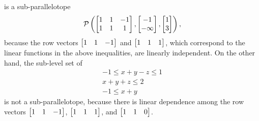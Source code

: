 %
is a sub-parallelotope
%
\[
\mathcal{P}\left(\left[\begin{matrix}
    1 & 1 & -1\\
    1 & 1 & 1
  \end{matrix}
  \right],\left[
    \begin{matrix}
      -1\\
      -\infty
    \end{matrix}
    \right]
,\left[
    \begin{matrix}
      1\\
      3
    \end{matrix}
    \right]
\right),
\]
because the row vectors $\left[\begin{matrix}1 & 1 &
    -1 \end{matrix}\right]$ and $\left[\begin{matrix}1 & 1 &
    1 \end{matrix}\right]$, which correspond to the linear functions in the
above inequalities, are linearly independent.  On the other hand, the
sub-level set of
%
\begin{align*}
  -1\leq x+y-z\leq 1\\
  x+y+z\leq 2\\
  -1\leq x+y
\end{align*}
%
is not a sub-parallelotope, because there is linear dependence among
the row vectors $\left[\begin{matrix} 1 & 1 & -1\end{matrix}\right]$,
$\left[\begin{matrix} 1 & 1 & 1\end{matrix}\right]$, and
$\left[\begin{matrix} 1 & 1 & 0 \end{matrix}\right]$.

